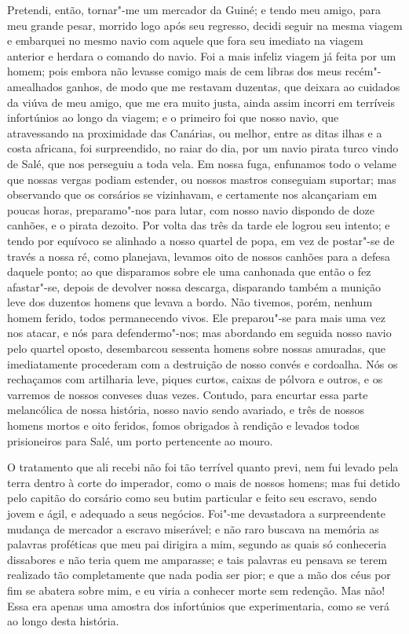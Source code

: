 Pretendi, então, tornar"-me um mercador da Guiné; e tendo meu amigo, para
meu grande pesar, morrido logo após seu regresso, decidi seguir na mesma
viagem e embarquei no mesmo navio com aquele que fora seu imediato na
viagem anterior e herdara o comando do navio. Foi a mais infeliz viagem
já feita por um homem; pois embora não levasse comigo mais de cem libras
dos meus recém"-amealhados ganhos, de modo que me restavam duzentas, que
deixara ao cuidados da viúva de meu amigo, que me era muito justa, ainda
assim incorri em terríveis infortúnios ao longo da viagem; e o primeiro
foi que nosso navio, que atravessando na proximidade das Canárias, ou
melhor, entre as ditas ilhas e a costa africana, foi surpreendido, no
raiar do dia, por um navio pirata turco vindo de Salé, que nos perseguiu
a toda vela. Em nossa fuga, enfunamos todo o velame que nossas vergas
podiam estender, ou nossos mastros conseguiam suportar; mas observando
que os corsários se vizinhavam, e certamente nos alcançariam em poucas
horas, preparamo"-nos para lutar, com nosso navio dispondo de doze
canhões, e o pirata dezoito. Por volta das três da tarde ele logrou seu
intento; e tendo por equívoco se alinhado a nosso quartel de popa, em
vez de postar"-se de través a nossa ré, como planejava, levamos oito de
nossos canhões para a defesa daquele ponto; ao que disparamos sobre ele
uma canhonada que então o fez afastar"-se, depois de devolver nossa
descarga, disparando também a munição leve dos duzentos homens que
levava a bordo. Não tivemos, porém, nenhum homem ferido, todos
permanecendo vivos. Ele preparou"-se para mais uma vez nos atacar, e nós
para defendermo"-nos; mas abordando em seguida nosso navio pelo quartel
oposto, desembarcou sessenta homens sobre nossas amuradas, que
imediatamente procederam com a destruição de nosso convés e cordoalha.
Nós os rechaçamos com artilharia leve, piques curtos, caixas de pólvora
e outros, e os varremos de nossos conveses duas vezes. Contudo, para
encurtar essa parte melancólica de nossa história, nosso navio sendo
avariado, e três de nossos homens mortos e oito feridos, fomos obrigados
à rendição e levados todos prisioneiros para Salé, um porto pertencente
ao mouro.

O tratamento que ali recebi não foi tão terrível quanto previ, nem fui
levado pela terra dentro à corte do imperador, como o mais de nossos
homens; mas fui detido pelo capitão do corsário como seu butim
particular e feito seu escravo, sendo jovem e ágil, e adequado a seus
negócios. Foi"-me devastadora a surpreendente mudança de mercador a
escravo miserável; e não raro buscava na memória as palavras proféticas
que meu pai dirigira a mim, segundo as quais só conheceria dissabores e
não teria quem me amparasse; e tais palavras eu pensava se terem
realizado tão completamente que nada podia ser pior; e que a mão dos
céus por fim se abatera sobre mim, e eu viria a conhecer morte sem
redenção. Mas não! Essa era apenas uma amostra dos infortúnios que
experimentaria, como se verá ao longo desta história.

